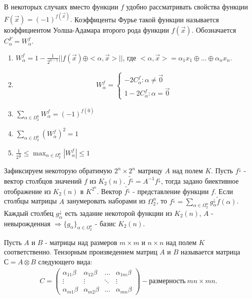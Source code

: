 В некоторых случаях вместо функции $f$ удобно рассматривать свойства функции $F(\vec{x}) = (-1)^{f(\vec{x})}.$ Коэффиценты Фурье такой функции называется коэффициентом Уолша-Адамара второго рода функции $f(\vec{x})$. Обозначается $C_\alpha^F = W_\alpha^f$.\\

\prop
\begin{enumerate}
    \item $W_\alpha^f = 1 - \frac{1}{2^{n-1}} ||f(\vec{x}) \oplus  <\alpha,\vec{x}>||$, где $<\alpha, \vec{x}> = \alpha_1 x_1 \oplus \dots \oplus \alpha_n x_n$.

    \item \begin{align*}
            W_\alpha^f =
                \begin{cases}
                    -2 C_\alpha^f  : \alpha \neq \vec{0}\\
                    1-2 C_\alpha^f : \alpha = \vec{0}
                \end{cases}
            \end{align*}
    
    \item $\sum_{\alpha \in \Omega_2^n} W_\alpha^f = (-1)^{f(\overline{0})} $

    \item $\sum_{\alpha \in \Omega_2^n} (W_\alpha^f)^2 = 1$

    \item $\frac{1}{2^{\frac{n}{2}}} \leq \max_{\alpha \in \Omega_2^n} |W_\alpha^f| \leq 1$
\end{enumerate}

Зафиксируем некоторую обратимую $2^n \times 2^n$ матрицу $A$ над полем $K$. Пусть $f^{\downarrow}$ - вектор столбцов значений $f$ из $K_2(n)$.
$\widetilde{f^\downarrow} = A^{-1} f^\downarrow$, тогда задано биективное отображение из $K_2(n)$ в $K^{2^n}$.
Вектор $\widetilde{f^\downarrow}$ - представление функции $f$.
Если столбцы матрицы $A$ занумеровать наборами из $\Omega_2^n$, то $f^\downarrow = \sum_{\alpha \in \Omega_2^n} g_\alpha^\downarrow \widetilde{f}(\alpha)$.
Каждый столбец $g_\alpha^\downarrow$ есть задание некоторой функции из $K_2(n)$, $A$ - невырожденная $\Rightarrow \{ g_\alpha \}_{\alpha \in \Omega_2^n}$ - базис $K_2(n)$.

\opri Пусть $A$ и $B$ - матрицы над размеров $m \times m$ и $n \times n$ над полем $K$ соответственно. Тензорным произведением матриц $A$ и $B$ называется матрица $С = A \otimes B$ следующего вида:
\begin{align*}
    C =
    \begin{pmatrix}
        \alpha_{11}\beta & \alpha_{12}\beta & \dots & \alpha_{1m}\beta \\
        \vdots & \vdots & \ddots  & \vdots \\
        \alpha_{m1}\beta & \alpha_{m2}\beta & \dots & \alpha_{mn}\beta
    \end{pmatrix}
    - \text{размерность}\  mn \times mn.
\end{align*}

